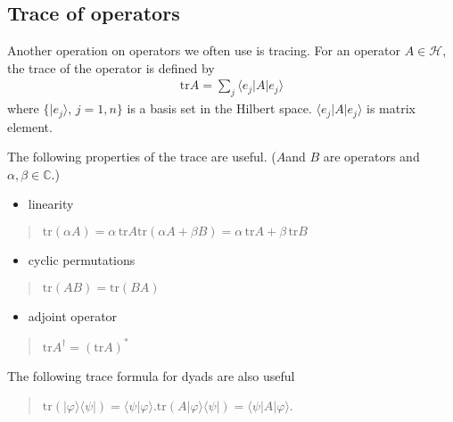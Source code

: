 \documentclass[letterpaper,10pt,english]{jupyterBook}
\begin{document}
\subsection{Trace of operators}
\label{\detokenize{qmsummary/operators:trace-of-operators}}
\sphinxAtStartPar
Another operation on operators we often use is tracing.   For an operator \(A \in \mathcal{H}\), the trace of the operator is defined by
\begin{equation*}
\begin{split}
\text{tr} A = \sum_j  \langle e_j| A  |e_j\rangle
\end{split}
\end{equation*}
\sphinxAtStartPar
where \(\{|e_j\rangle, \, j=1,n\}\) is a basis set in the Hilbert space.  \(\langle e_j| A  |e_j\rangle\) is matrix element.

\sphinxAtStartPar
The following properties of the trace are useful.  (\(A\)and \(B\) are operators and \(\alpha, \beta \in \mathbb{C}\).)
\begin{itemize}
\item {}
\sphinxAtStartPar
linearity

\end{itemize}
\begin{quote}

\sphinxAtStartPar
\(\text{tr}\left(\alpha A\right) = \alpha\, \text{tr} A\)\(\text{tr} \left(\alpha A+\beta B\right) = \alpha\, \text{tr} A + \beta\, \text{tr} B\)
\end{quote}
\begin{itemize}
\item {}
\sphinxAtStartPar
cyclic permutations

\end{itemize}
\begin{quote}

\sphinxAtStartPar
\(\text{tr}\left(AB\right) = \text{tr}\left(BA\right)\)
\end{quote}
\begin{itemize}
\item {}
\sphinxAtStartPar
adjoint operator

\end{itemize}
\begin{quote}

\sphinxAtStartPar
\(\text{tr} A^\dagger = (\text{tr} A)^*\)
\end{quote}

\sphinxAtStartPar
The following trace formula for dyads are also useful
\begin{quote}

\sphinxAtStartPar
\(\text{tr}\left(|\varphi\rangle\langle \psi|\right) = \langle\psi|\varphi\rangle\).\(\text{tr}\left(A|\varphi\rangle\langle \psi|\right) = \langle\psi|A|\varphi\rangle\).
\end{quote}
\end{document}
